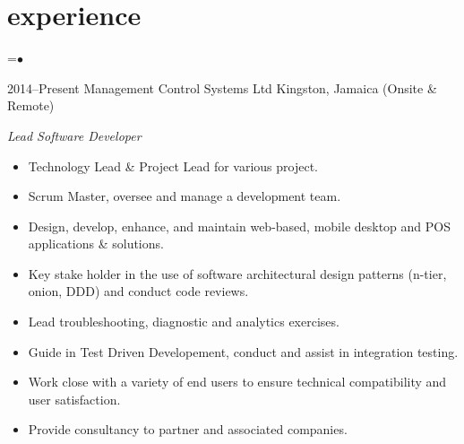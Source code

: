 \documentclass[]{friggeri-cvRS}
\begin{document}

\section{experience}

=\hbox{$\bullet$}
\begin{entrylist}
  \entry
    {2014--Present}
    {Management Control Systems Ltd}
    {Kingston, Jamaica (Onsite \& Remote)}
    {\emph{Lead Software Developer}
    \begin{itemize}
	\item Technology Lead \& Project Lead for various project.
	\item Scrum Master, oversee and manage a development team.
	\item Design, develop, enhance, and maintain web-based, mobile desktop and POS applications \& solutions.
	\item Key stake holder in the use of software architectural design patterns (n-tier, onion, DDD) and conduct code reviews.
	\item Lead troubleshooting, diagnostic and analytics exercises.
	\item Guide in Test Driven Developement, conduct and assist in integration testing.
	\item Work close with a variety of end users to ensure technical compatibility and user satisfaction.
	\item Provide consultancy to partner and associated companies.\\


\end{itemize}}
\end{entrylist}
\end{document}
